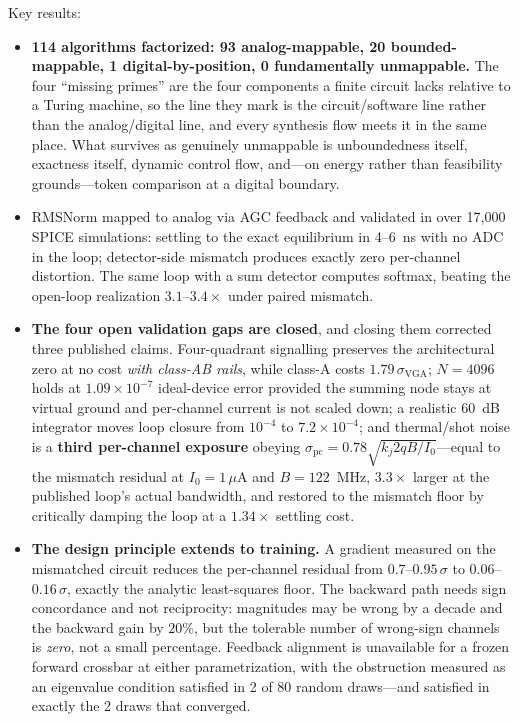 \documentclass[11pt]{article}
\begin{document}
Key results:
\begin{itemize}[leftmargin=*]
\item \textbf{114 algorithms factorized: 93 analog-mappable, 20 bounded-mappable, 1 digital-by-position, 0 fundamentally unmappable.} The four ``missing primes'' are the four components a finite circuit lacks relative to a Turing machine, so the line they mark is the circuit/software line rather than the analog/digital line, and every synthesis flow meets it in the same place. What survives as genuinely unmappable is unboundedness itself, exactness itself, dynamic control flow, and---on energy rather than feasibility grounds---token comparison at a digital boundary.
\item RMSNorm mapped to analog via AGC feedback and validated in over 17{,}000 SPICE simulations: settling to the exact equilibrium in 4--6~ns with no ADC in the loop; detector-side mismatch produces exactly zero per-channel distortion. The same loop with a sum detector computes softmax, beating the open-loop realization $3.1$--$3.4\times$ under paired mismatch.
\item \textbf{The four open validation gaps are closed}, and closing them corrected three published claims. Four-quadrant signalling preserves the architectural zero at no cost \textit{with class-AB rails}, while class-A costs $1.79\,\sigma_{\mathrm{VGA}}$; $N = 4096$ holds at $1.09\times10^{-7}$ ideal-device error provided the summing node stays at virtual ground and per-channel current is not scaled down; a realistic 60~dB integrator moves loop closure from $10^{-4}$ to $7.2\times10^{-4}$; and thermal/shot noise is a \textbf{third per-channel exposure} obeying $\sigma_{\mathrm{pc}} = 0.78\sqrt{k_j 2qB/I_0}$---equal to the mismatch residual at $I_0 = 1\,\mu$A and $B = 122$~MHz, $3.3\times$ larger at the published loop's actual bandwidth, and restored to the mismatch floor by critically damping the loop at a $1.34\times$ settling cost.
\item \textbf{The design principle extends to training.} A gradient measured on the mismatched circuit reduces the per-channel residual from $0.7$--$0.95\,\sigma$ to $0.06$--$0.16\,\sigma$, exactly the analytic least-squares floor. The backward path needs sign concordance and not reciprocity: magnitudes may be wrong by a decade and the backward gain by $20\%$, but the tolerable number of wrong-sign channels is \textit{zero}, not a small percentage. Feedback alignment is unavailable for a frozen forward crossbar at either parametrization, with the obstruction measured as an eigenvalue condition satisfied in 2 of 80 random draws---and satisfied in exactly the 2 draws that converged.

\end{itemize}
\end{document}
